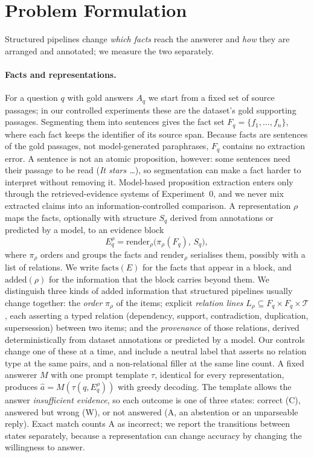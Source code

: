 \section{Problem Formulation}
\label{sec:problem}

Structured pipelines change \emph{which facts} reach the answerer and \emph{how} they are arranged and annotated; we measure the two separately.

\paragraph{Facts and representations.}
For a question $q$ with gold answers $A_q$ we start from a fixed set of source passages; in our controlled experiments these are the dataset's gold supporting passages. Segmenting them into sentences gives the fact set $F_q=\{f_1,\dots,f_n\}$, where each fact keeps the identifier of its source span. Because facts are sentences of the gold passages, not model-generated paraphrases, $F_q$ contains no extraction error. A sentence is not an atomic proposition, however: some sentences need their passage to be read (\emph{It stars \dots}), so segmentation can make a fact harder to interpret without removing it. Model-based proposition extraction enters only through the retrieved-evidence systems of Experiment~0, and we never mix extracted claims into an information-controlled comparison. A representation $\rho$ maps the facts, optionally with structure $S_q$ derived from annotations or predicted by a model, to an evidence block
\begin{equation}
E_q^{\rho}=\mathrm{render}_\rho\big(\pi_\rho(F_q),\,S_q\big),
\end{equation}
where $\pi_\rho$ orders and groups the facts and $\mathrm{render}_\rho$ serialises them, possibly with a list of relations. We write $\mathrm{facts}(E)$ for the facts that appear in a block, and $\mathrm{added}(\rho)$ for the information that the block carries beyond them. We distinguish three kinds of added information that structured pipelines usually change together: the \emph{order} $\pi_\rho$ of the items; explicit \emph{relation lines} $L_\rho\subseteq F_q\times F_q\times\mathcal{T}$, each asserting a typed relation (dependency, support, contradiction, duplication, supersession) between two items; and the \emph{provenance} of those relations, derived deterministically from dataset annotations or predicted by a model. Our controls change one of these at a time, and include a neutral label that asserts no relation type at the same pairs, and a non-relational filler at the same line count. A fixed answerer $M$ with one prompt template $\tau$, identical for every representation, produces $\hat a=M(\tau(q,E_q^{\rho}))$ with greedy decoding. The template allows the answer \emph{insufficient evidence}, so each outcome is one of three states: correct (C), answered but wrong (W), or not answered (A, an abstention or an unparseable reply). Exact match counts A as incorrect; we report the transitions between states separately, because a representation can change accuracy by changing the willingness to answer.


